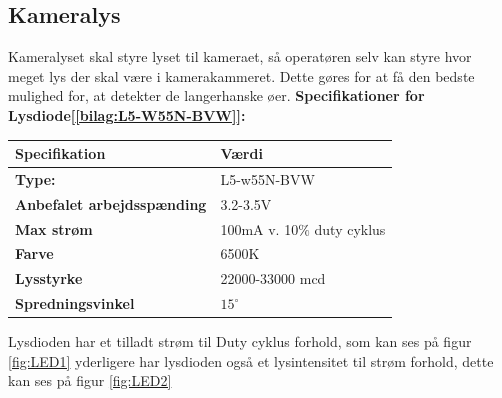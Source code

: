 \subsection{Kameralys}
\label{subsec:kameralys}
Kameralyset skal styre lyset til kameraet, så operatøren selv kan styre hvor meget lys der skal være i kamerakammeret. Dette gøres for at få den bedste mulighed for, at detekter de langerhanske øer.
\textbf{Specifikationer for Lysdiode[\ref{bilag:L5-W55N-BVW}]:} 
\begin{center}
		\begin{longtable}{ | m{6.5cm} | m{6.5cm}| } 
			\hline
			\textbf{Specifikation} &\textbf{Værdi} \\ 
			\hline
			\textbf{Type:} & L5-w55N-BVW \\ 
			\hline
			\textbf{Anbefalet arbejdsspænding} & 3.2-3.5V \\ 
			\hline
			\textbf{Max strøm} & 100mA v. 10$\%$ duty cyklus \\ 
			\hline
			\textbf{Farve} & 6500K \\ 
			\hline
			\textbf{Lysstyrke} & 22000-33000 mcd \\ 
			\hline
			\textbf{Spredningsvinkel} & $15^{\circ}$ \\ 
			\hline
		\end{longtable}
\end{center}

Lysdioden har et tilladt strøm til Duty cyklus forhold, som kan ses på figur \ref{fig:LED1} yderligere har lysdioden også et lysintensitet til strøm forhold, dette kan ses på figur \ref{fig:LED2} 

